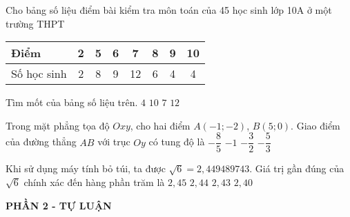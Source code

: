 \begin{ex}%
	Cho bảng số liệu điểm bài kiểm tra môn toán của 45 học sinh lớp 10A ở một trường THPT
	\begin{center}
	\begin{tabular}{|l|c|c|c|c|c|c|c|}
		\hline Điểm & 2 & 5 & 6 & 7 & 8 & 9 & 10 \\
		\hline Số học sinh & 2 & 8 & 9 & 12 & 6 & 4 & 4 \\
		\hline
	\end{tabular}
\end{center}
	Tìm mốt của bảng số liệu trên.
	\choice
	{$4$}
	{$10$}
	{\True $7$}
	{$12$}
\end{ex}

\begin{ex}%
	Trong mặt phẳng tọa độ $Oxy$, cho hai điểm $A(-1;-2)$, $B(5;0)$. Giao điểm của đường thẳng $AB$ với trục $Oy$ có tung độ là
	\choice
	{$-\dfrac{8}{5}$}
	{$-1$ }
	{$-\dfrac{3}{2}$}
	{\True $-\dfrac{5}{3}$}
\end{ex}

\begin{ex}%
	Khi sử dụng máy tính bỏ túi, ta được $\sqrt{6}=2{,}449489743$. Giá trị gần đúng của $\sqrt{6}$ chính xác đến hàng phần trăm là
	\choice
	{\True $2{,}45$}
	{$2{,}44$}
	{$2{,}43$}
	{$2{,}40$}
\end{ex}

\begin{center}
	\textbf{PHẦN 2 - TỰ LUẬN}
\end{center}

